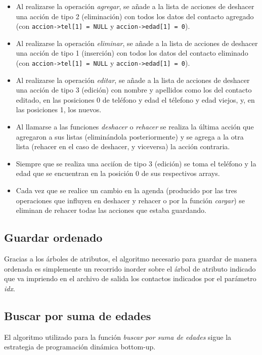 \documentclass[11pt]{article}
\begin{document}
    \begin{itemize}
      \item Al realizarse la operaci\'on \emph{agregar}, se a\~{n}ade a la lista de acciones de deshacer una acci\'on de tipo 2 (eliminaci\'on) con todos los datos del contacto agregado (con \verb|accion->tel[1] = NULL| y \verb|accion->edad[1] = 0|).
      \item Al realizarse la operaci\'on \emph{eliminar}, se a\~{n}ade a la lista de acciones de deshacer una acci\'on de tipo 1 (inserci\'on) con todos los datos del contacto eliminado (con \verb|accion->tel[1] = NULL| y \verb|accion->edad[1] = 0|).
      \item Al realizarse la operaci\'on \emph{editar}, se a\~{n}ade a la lista de acciones de deshacer una acci\'on de tipo 3 (edici\'on) con nombre y apellidos como los del contacto editado, en las posiciones 0 de tel\'efono y edad el t\'elefono y edad viejos, y, en las posiciones 1, los nuevos.
      \item Al llamarse a las funciones \emph{deshacer} o \emph{rehacer} se realiza la \'ultima acci\'on que agregaron a sus listas (elimin\'andola posteriormente) y se agrega a la otra lista (rehacer en el caso de deshacer, y viceversa) la acci\'on contraria.
      \item Siempre que se realiza una acci\'ion de tipo 3 (edici\'on) se toma el tel\'efono y la edad que se encuentran en la posici\'on 0 de sus respectivos arrays.
      \item Cada vez que se realice un cambio en la agenda (producido por las tres operaciones que influyen en deshacer y rehacer o por la funci\'on \emph{cargar}) se eliminan de rehacer todas las acciones que estaba guardando. 
    \end{itemize}

    \subsection{Guardar ordenado}
    Gracias a los \'arboles de atributos, el algoritmo necesario para guardar de manera ordenada es simplemente un recorrido inorder sobre el \'arbol de atributo indicado que va impriendo en el archivo de salida los contactos indicados por el par\'ametro \emph{idx}.

    \subsection{Buscar por suma de edades}
    El algoritmo utilizado para la funci\'on \emph{buscar por suma de edades} sigue la estrategia de programaci\'on din\'amica bottom-up. 
\end{document}
